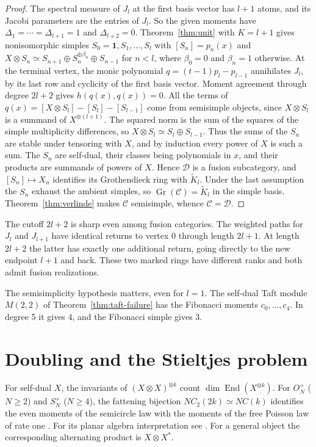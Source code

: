 \documentclass[11pt,reqno]{amsart}
\theoremstyle{definition}
\newcommand{\End}{\operatorname{End}}
\newcommand{\one}{\mathbf 1}
\newcommand{\C}{\mathcal C}
\DeclareMathOperator{\Gr}{Gr}
\begin{document}
\begin{proof}
The spectral measure of $J_l$ at the first basis vector has $l+1$ atoms, and its Jacobi parameters are the entries of $J_l$. So the given moments have $\Delta_1=\cdots=\Delta_{l+1}=1$ and $\Delta_{l+2}=0$. Theorem~\ref{thm:unit} with $K=l+1$ gives nonisomorphic simples $S_0=\one,S_1,\ldots,S_l$ with $[S_n]=p_n(x)$ and $X\otimes S_n\simeq S_{n+1}\oplus S_n^{\oplus\beta_n}\oplus S_{n-1}$ for $n<l$, where $\beta_0=0$ and $\beta_n=1$ otherwise. At the terminal vertex, the monic polynomial $q=(t-1)p_l-p_{l-1}$ annihilates $J_l$, by its last row and cyclicity of the first basis vector. Moment agreement through degree $2l+2$ gives $h(q(x),q(x))=0$. All the terms of $q(x)=[X\otimes S_l]-[S_l]-[S_{l-1}]$ come from semisimple objects, since $X\otimes S_l$ is a summand of $X^{\otimes(l+1)}$. The squared norm is the sum of the squares of the simple multiplicity differences, so $X\otimes S_l\simeq S_l\oplus S_{l-1}$. Thus the sums of the $S_n$ are stable under tensoring with $X$, and by induction every power of $X$ is such a sum. The $S_n$ are self-dual, their classes being polynomials in $x$, and their products are summands of powers of $X$. Hence $\mathcal D$ is a fusion subcategory, and $[S_n]\mapsto X_n$ identifies its Grothendieck ring with $\widetilde K_l$. Under the last assumption the $S_n$ exhaust the ambient simples, so $\Gr(\C)=\widetilde K_l$ in the simple basis. Theorem~\ref{thm:verlinde} makes $\C$ semisimple, whence $\C=\mathcal D$.
\end{proof}

The cutoff $2l+2$ is sharp even among fusion categories. The weighted paths
for $J_l$ and $J_{l+1}$ have identical returns to vertex $0$ through
length $2l+1$. At length $2l+2$ the latter has exactly one additional
return, going directly to the new endpoint $l+1$ and back. These two
marked rings have different ranks and both admit fusion realizations.

The semisimplicity hypothesis matters, even for $l=1$. The self-dual Taft module $M(2,2)$ of Theorem~\ref{thm:taft-failure} has the Fibonacci moments $c_0,\ldots,c_4$. In degree 5 it gives $4$, and the Fibonacci simple gives $3$.

\section{Doubling and the Stieltjes problem}\label{sec:doubling}

For self-dual $X$, the invariants of $(X\otimes X)^{\otimes k}$ count
$\dim\End(X^{\otimes k})$. For $O_N^+$ ($N\ge2$) and $S_N^+$ ($N\ge4$),
the fattening bijection $NC_2(2k)\simeq NC(k)$ identifies the even moments
of the semicircle law with the moments of the free Poisson law of rate one
\cite{BCS}. For its planar algebra interpretation see \cite{Banica,Jones}.
For a general object the corresponding alternating product is $X\otimes X^*$.
\end{document}
